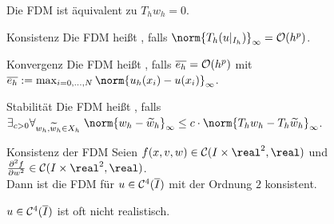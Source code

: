\begin{Bem}
    Die FDM ist äquivalent zu $T_h w_h = 0$.
\end{Bem}

\begin{Def}{Konsistenz}
    Die FDM heißt , falls
    $\norm{T_h (u|_{I_h})}_\infty = \O(h^p)$.
\end{Def}

\begin{Def}{Konvergenz}
    Die FDM heißt , falls
    $\overline{e_h} = \mathcal{O}(h^p)$ mit\\
    $\overline{e_h} := \max_{i=0,\dotsc,N} \norm{u_h(x_i) - u(x_i)}_\infty$.
\end{Def}

\begin{Def}{Stabilität}
    Die FDM heißt , falls
    $\exists_{c > 0} \forall_{w_h, \widetilde{w}_h \in X_h}\;
    \norm{w_h - \widetilde{w}_h}_\infty \le c \cdot
    \norm{T_h w_h - T_h \widetilde{w}_h}_\infty$.
\end{Def}

\begin{Satz}{Konsistenz der FDM}
    Seien $f(x, v, w) \in \C(I \times \real^2, \real)$ und
    $\frac{\partial^2 f}{\partial w^2} \in \C(I \times \real^2, \real)$.\\
    Dann ist die FDM für $u \in \mathcal{C}^4(\overline{I})$ mit der Ordnung $2$
    konsistent.
\end{Satz}

\begin{Bem}
    $u \in \mathcal{C}^4(\overline{I})$ ist oft nicht realistisch.
\end{Bem}

\linie
\pagebreak


